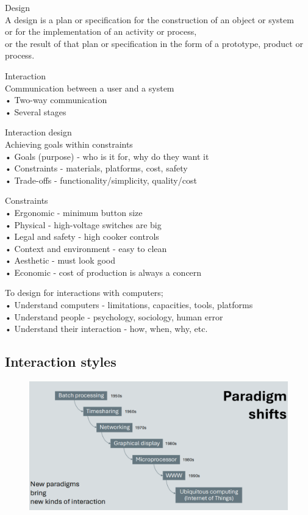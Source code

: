 \documentclass[]{project_plan}
\begin{document}
Design\\
A design is a plan or specification for the construction of an object or system\\
or                                  for the implementation of an activity or process,\\
or the result of that plan or specification in the form of a prototype, product or process.

Interaction\\
Communication between a user and a system\\
• Two-way communication\\
• Several stages

Interaction design\\
Achieving goals within constraints\\
• Goals (purpose) - who is it for, why do they want it\\
• Constraints - materials, platforms, cost, safety\\
• Trade-offs - functionality/simplicity, quality/cost

Constraints\\
• Ergonomic - minimum button size\\
• Physical - high-voltage switches are big\\
• Legal and safety - high cooker controls\\
• Context and environment - easy to clean\\
• Aesthetic - must look good\\
• Economic - cost of production is always a concern

To design for interactions with computers;\\
• Understand computers - limitations, capacities, tools, platforms\\
• Understand people - psychology, sociology, human error\\
• Understand their interaction - how, when, why, etc.

\subsection{Interaction styles}

\begin{figure}[h!]
  \centering
  \includegraphics[width=\linewidth]{paradigm_shifts.png}
\end{figure}
\end{document}
